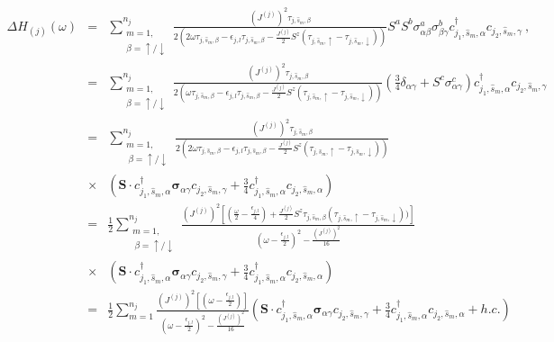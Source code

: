 \documentclass[aps,prl,preprint,groupedaddress]{revtex4-2}
\begin{document}
\begin{eqnarray}
\Delta H_{(j)}(\omega)&=&\sum_{\substack{m=1,\\ \beta=\uparrow/\downarrow}}^{n_{j}}\frac{(J^{(j)})^{2}\tau_{j,\hat{s}_{m},\beta}}{2(2\omega\tau_{j,\hat{s}_{m},\beta} - \epsilon_{j,l}\tau_{j,\hat{s}_{m},\beta}-\frac{J^{(j)}}{2}S^{z}(\tau_{j,\hat{s}_{m},\uparrow}-\tau_{j,\hat{s}_{m},\downarrow}))}S^{a}S^{b}\sigma^{a}_{\alpha\beta}\sigma^{b}_{\beta\gamma} c^{\dagger}_{j_{1},\hat{s}_{m},\alpha}c_{j_{2},\hat{s}_{m},\gamma}~,~~~~~~\nonumber\\
&=&\sum_{\substack{m=1,\\ \beta=\uparrow/\downarrow}}^{n_{j}}\frac{(J^{(j)})^{2}\tau_{j,\hat{s}_{m},\beta}}{2(\omega\tau_{j,\hat{s}_{m},\beta} - \epsilon_{j,l}\tau_{j,\hat{s}_{m},\beta}-\frac{J^{(j)}}{2}S^{z}(\tau_{j,\hat{s}_{m},\uparrow}-\tau_{j,\hat{s}_{m},\downarrow}))}(\frac{3}{4}\delta_{\alpha\gamma}+S^{c}\sigma^{c}_{\alpha\gamma}) c^{\dagger}_{j_{1},\hat{s}_{m},\alpha}c_{j_{2},\hat{s}_{m},\gamma}\nonumber\\
&=&\sum_{\substack{m=1,\\~\beta=\uparrow/\downarrow}}^{n_{j}}\frac{(J^{(j)})^{2}\tau_{j,\hat{s}_{m},\beta}}{2(2\omega\tau_{j,\hat{s}_{m},\beta}- \epsilon_{j,l}\tau_{j,\hat{s}_{m},\beta}-\frac{J^{(j)}}{2}S^{z}(\tau_{j,\hat{s}_{m},\uparrow}-\tau_{j,\hat{s}_{m},\downarrow}))}\nonumber\\
&\times &\left(\mathbf{S}\cdot c^{\dagger}_{j_{1},\hat{s}_{m},\alpha}\boldsymbol{\sigma}_{\alpha\gamma} c_{j_{2},\hat{s}_{m},\gamma}+\frac{3}{4}c^{\dagger}_{j_{1},\hat{s}_{m},\alpha}c_{j_{2},\hat{s}_{m},\alpha}\right)\nonumber\\
&=&\frac{1}{2}\sum_{\substack{m=1,\\~\beta=\uparrow/\downarrow}}^{n_{j}}\frac{(J^{(j)})^{2}\left[(\frac{\omega}{2} - \frac{\epsilon_{j,l}}{4})+\frac{J^{(j)}}{2}S^{z}\tau_{j,\hat{s}_{m},\beta}(\tau_{j,\hat{s}_{m},\uparrow}-\tau_{j,\hat{s}_{m},\downarrow}))\right]}{(\omega - \frac{\epsilon_{j,l}}{2})^{2}-\frac{\left(J^{(j)}\right)^{2}}{16}}\nonumber\\
&\times &\left(\mathbf{S}\cdot c^{\dagger}_{j_{1},\hat{s}_{m},\alpha}\boldsymbol{\sigma}_{\alpha\gamma} c_{j_{2},\hat{s}_{m},\gamma}+\frac{3}{4}c^{\dagger}_{j_{1},\hat{s}_{m},\alpha}c_{j_{2},\hat{s}_{m},\alpha}\right)\nonumber\\
&=&\frac{1}{2}\sum_{m=1}^{n_{j}}\frac{(J^{(j)})^{2}\left[(\omega - \frac{\epsilon_{j,l}}{2})\right]}{(\omega - \frac{\epsilon_{j,l}}{2})^{2}-\frac{\left(J^{(j)}\right)^{2}}{16}}\left(\mathbf{S}\cdot c^{\dagger}_{j_{1},\hat{s}_{m},\alpha}\boldsymbol{\sigma}_{\alpha\gamma}c_{j_{2},\hat{s}_{m},\gamma}+\frac{3}{4}c^{\dagger}_{j_{1},\hat{s}_{m},\alpha}c_{j_{2},\hat{s}_{m},\alpha}+h.c.\right)\label{renH}
\end{eqnarray}
\end{document}
